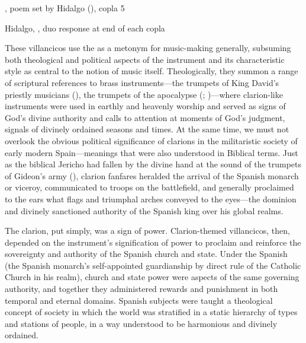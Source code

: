 {, poem set by Hidalgo (), copla 5}

{Hidalgo, , duo response at end of each copla}

These villancicos use the  as a metonym for music-making
generally, subsuming both theological and political aspects of the instrument
and its characteristic style as central to the notion of music itself.
Theologically, they summon a range of scriptural references to brass
instruments---the trumpets of King David's priestly musicians
(), the trumpets of the apocalypse
(; )---where clarion-like
instruments were used in earthly and heavenly worship and served as signs of
God's divine authority and calls to attention at moments of God's judgment,
signals of divinely ordained seasons and times.%
At the same time, we must not overlook the obvious political significance of
clarions in the militaristic society of early modern Spain---meanings that were
also understood in Biblical terms.
Just as the biblical Jericho had fallen by the divine hand at the sound of the
trumpets of Gideon's army (), clarion fanfares heralded
the arrival of the Spanish monarch or viceroy, communicated to troops on the
battlefield, and generally proclaimed to the ears what flags and triumphal arches
conveyed to the eyes---the dominion and divinely sanctioned authority of the
Spanish king over his global realms.

The clarion, put simply, was a sign of power.
Clarion-themed villancicos, then, depended on the instrument's signification of
power to proclaim and reinforce the sovereignty and authority of the Spanish
church and state.
Under the Spanish  (the Spanish monarch's self-appointed
guardianship by direct rule of the Catholic Church in his realm), church and
state power were aspects of the same governing authority, and together they
administered rewards and punishment in both temporal and eternal domains.
Spanish subjects were taught a theological concept of society in which the
world was stratified in a static hierarchy of types and stations of people, in
a way understood to be harmonious and divinely ordained.

